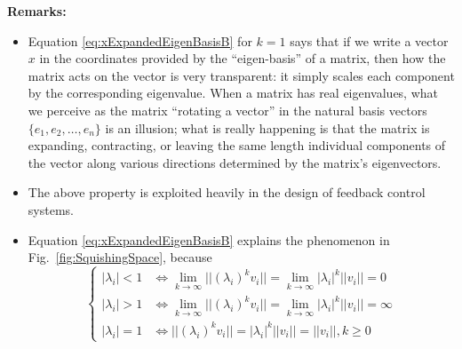 \documentclass[letterpaper]{book}
\begin{document}
\textbf{Remarks:} 
\begin{itemize}
    \item Equation \eqref{eq:xExpandedEigenBasisB} for $k=1$ says that if we write a vector $x$ in the coordinates provided by the ``eigen-basis'' of a matrix, then how the matrix acts on the vector is very transparent: it simply scales each component by the corresponding eigenvalue. When a matrix has real eigenvalues, what we perceive as the matrix ``rotating a vector'' in the natural basis vectors $\{e_1, e_2, \ldots, e_n \}$ is an illusion; what is really happening is that the matrix is expanding, contracting, or leaving the same length individual components of the vector along various directions determined by the matrix's eigenvectors. 
    \item The above property is exploited heavily in the design of feedback control systems. 
    \item Equation \eqref{eq:xExpandedEigenBasisB} explains the phenomenon in Fig.~\ref{fig:SquishingSpace}, because 
    $$ \begin{cases} 
    |\lambda_i| < 1 & \iff  \lim_{k \to \infty}  ||(\lambda_i)^k v_i||= \lim_{k \to \infty}  |\lambda_i|^k  ||v_i||=0\\  
    |\lambda_i| >1 & \iff  \lim_{k \to \infty}  ||(\lambda_i)^k v_i||= \lim_{k \to \infty}  |\lambda_i|^k  ||v_i||= \infty \\
    |\lambda_i|= 1 & \iff || (\lambda_i)^k v_i|| = |\lambda_i|^k  || v_i||= ||v_i||, k\ge 0 
    \end{cases} 
    $$

\end{itemize}
\end{document}
